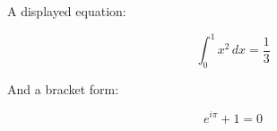 A displayed equation:

$$
\int_{0}^{1} x^2 \, dx = \frac{1}{3}
$$

And a bracket form:

\[
  e^{i\pi} + 1 = 0
\]

